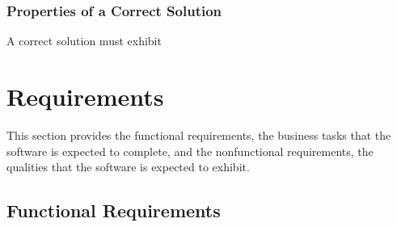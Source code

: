\documentclass[12pt]{article}
\begin{document}
\subsubsection{Properties of a Correct Solution} \label{sec_CorrectSolution}

\noindent
{}
A correct solution must exhibit 

\section{Requirements}

This section provides the functional requirements, the business tasks that the
software is expected to complete, and the nonfunctional requirements, the
qualities that the software is expected to exhibit.

\subsection{Functional Requirements}
\end{document}
